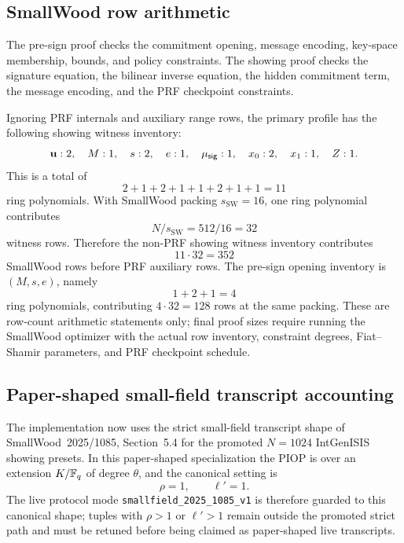 \subsection{SmallWood row arithmetic}
The pre-sign proof checks the commitment opening, message encoding, key-space membership, bounds, and policy
constraints.  The showing proof checks the signature equation, the bilinear inverse equation, the hidden commitment
term, the message encoding, and the PRF checkpoint constraints.

Ignoring PRF internals and auxiliary range rows, the primary profile has the following showing witness inventory:
\[
  \mathbf{u}:2,
  \quad
  M:1,
  \quad
  s:2,
  \quad
  e:1,
  \quad
  \mu_{\mathsf{sig}}:1,
  \quad
  x_0:2,
  \quad
  x_1:1,
  \quad
  Z:1.
\]
This is a total of
\[
  2+1+2+1+1+2+1+1=11
\]
ring polynomials.  With SmallWood packing \(s_{\mathrm{SW}}=16\), one ring polynomial contributes
\[
  N/s_{\mathrm{SW}}=512/16=32
\]
witness rows.  Therefore the non-PRF showing witness inventory contributes
\[
  11\cdot 32=352
\]
SmallWood rows before PRF auxiliary rows.  The pre-sign opening inventory is \((M,s,e)\), namely
\[
  1+2+1=4
\]
ring polynomials, contributing \(4\cdot32=128\) rows at the same packing.  These are row-count arithmetic
statements only; final proof sizes require running the SmallWood optimizer with the actual row inventory, constraint
degrees, Fiat--Shamir parameters, and PRF checkpoint schedule.

\subsection{Paper-shaped small-field transcript accounting}
\label{subsec:paper-shaped-smallfield-accounting}

The implementation now uses the strict small-field transcript shape of SmallWood~2025/1085, Section~5.4 for the
promoted \(N=1024\) IntGenISIS showing presets.  In this paper-shaped specialization the PIOP is over an extension
\(K/\mathbb{F}_q\) of degree \(\theta\), and the canonical setting is
\[
  \rho=1,
  \qquad
  \ell'=1.
\]
The live protocol mode \texttt{smallfield\_2025\_1085\_v1} is therefore guarded to this canonical shape; tuples with
\(\rho>1\) or \(\ell'>1\) remain outside the promoted strict path and must be retuned before being claimed as
paper-shaped live transcripts.

